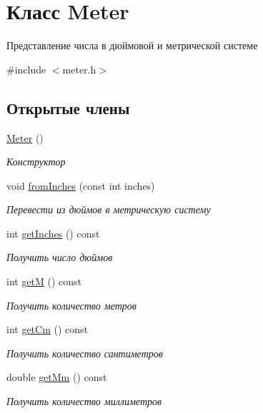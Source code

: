 \hypertarget{classMeter}{}\section{Класс Meter}
\label{classMeter}


Представление числа в дюймовой и метрической системе  




{\ttfamily \#include $<$meter.\+h$>$}

\subsection*{Открытые члены}
\begin{DoxyCompactItemize}
\item 
\hypertarget{classMeter_a2af268d76057a35b0ca984b0d801566d}{}\hyperlink{classMeter_a2af268d76057a35b0ca984b0d801566d}{Meter} ()\label{classMeter_a2af268d76057a35b0ca984b0d801566d}

\begin{DoxyCompactList}\small\item\em Конструктор \end{DoxyCompactList}\item 
void \hyperlink{classMeter_a450db5b360dd7c9a8ab809ad0dc40020}{from\+Inches} (const int inches)
\begin{DoxyCompactList}\small\item\em Перевести из дюймов в метрическую систему \end{DoxyCompactList}\item 
int \hyperlink{classMeter_a65803825e9bb16c9311aca24f9736d27}{get\+Inches} () const 
\begin{DoxyCompactList}\small\item\em Получить число дюймов \end{DoxyCompactList}\item 
int \hyperlink{classMeter_a9f2cc41219c399514e03ba16f0c78848}{get\+M} () const 
\begin{DoxyCompactList}\small\item\em Получить количество метров \end{DoxyCompactList}\item 
int \hyperlink{classMeter_a8015e04ac0529a17a431f9e373da66f1}{get\+Cm} () const 
\begin{DoxyCompactList}\small\item\em Получить количество сантиметров \end{DoxyCompactList}\item 
double \hyperlink{classMeter_a0e363d6a15b28916629621083ad2780f}{get\+Mm} () const 
\begin{DoxyCompactList}\small\item\em Получить количество миллиметров \end{DoxyCompactList}\end{DoxyCompactItemize}


